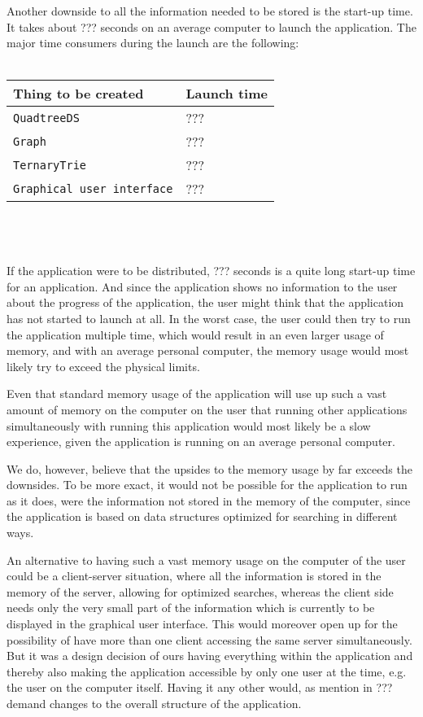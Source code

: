 \documentclass[a4paper,11pt]{article}
\begin{document}
Another downside to all the information needed to be stored is the start-up time. It takes about ??? seconds on an average computer to launch the application. The major time consumers during the launch are the following: \\ \\
\begin{tabular}{ p{5cm} | p{3cm} }
	\textbf{Thing to be created} & \textbf{Launch time} \\
	\hline
	\texttt{QuadtreeDS} & ??? \\
	\texttt{Graph} & ??? \\
	\texttt{TernaryTrie} & ??? \\
	\texttt{Graphical user interface} & ???
\end{tabular}
\\ \\ \\
If the application were to be distributed, ??? seconds is a quite long start-up time for an application. And since the application shows no information to the user about the progress of the application, the user might think that the application has not started to launch at all. In the worst case, the user could then try to run the application multiple time, which would result in an even larger usage of memory, and with an average personal computer, the memory usage would most likely try to exceed the physical limits.

Even that standard memory usage of the application will use up such a vast amount of memory on the computer on the user that running other applications simultaneously with running this application would most likely be a slow experience, given the application is running on an average personal computer.

We do, however, believe that the upsides to the memory usage by far exceeds the downsides. To be more exact, it would not be possible for the application to run as it does, were the information not stored in the memory of the computer, since the application is based on data structures optimized for searching in different ways.

An alternative to having such a vast memory usage on the computer of the user could be a client-server situation, where all the information is stored in the memory of the server, allowing for optimized searches, whereas the client side needs only the very small part of the information which is currently to be displayed in the graphical user interface. This would moreover open up for the possibility of have more than one client accessing the same server simultaneously. But it was a design decision of ours having everything within the application and thereby also making the application accessible by only one user at the time, e.g. the user on the computer itself. Having it any other would, as mention in ??? demand changes to the overall structure of the application.
\end{document}
